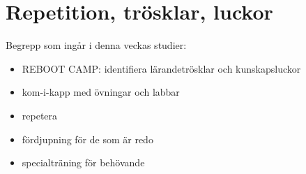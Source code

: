 \chapter{Repetition, trösklar, luckor}\label{chapter:W08}
Begrepp som ingår i denna veckas studier:
\begin{itemize}[noitemsep,label={$\square$},leftmargin=*]
\item REBOOT CAMP: identifiera lärandetrösklar och kunskapsluckor
\item kom-i-kapp med övningar och labbar
\item repetera
\item fördjupning för de som är redo
\item specialträning för behövande\end{itemize}
